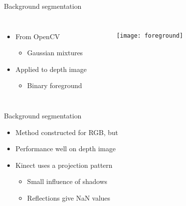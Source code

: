 
\begin{frame}{Background segmentation}

\begin{columns}
	\begin{itemize}

	\item From OpenCV
	\begin{itemize}
	\item Gaussian mixtures
	\end{itemize}
	\item Applied to depth image
	\begin{itemize}
	\item Binary foreground
    \end{itemize}
	\end{itemize}
	
	\begin{figure}[H]
	\begin{center}
	\texttt{[image: foreground]}
	\end{center}
	\end{figure}
	\end{columns}
\end{frame}
\begin{frame}{Background segmentation}

\begin{itemize}
	\item Method constructed for RGB, but
	\item Performance well on depth image
	\item Kinect uses a projection pattern
	\begin{itemize}
		\item Small influence of shadows
		\item Reflections give NaN values
	\end{itemize}
	\end{itemize}
\end{frame}